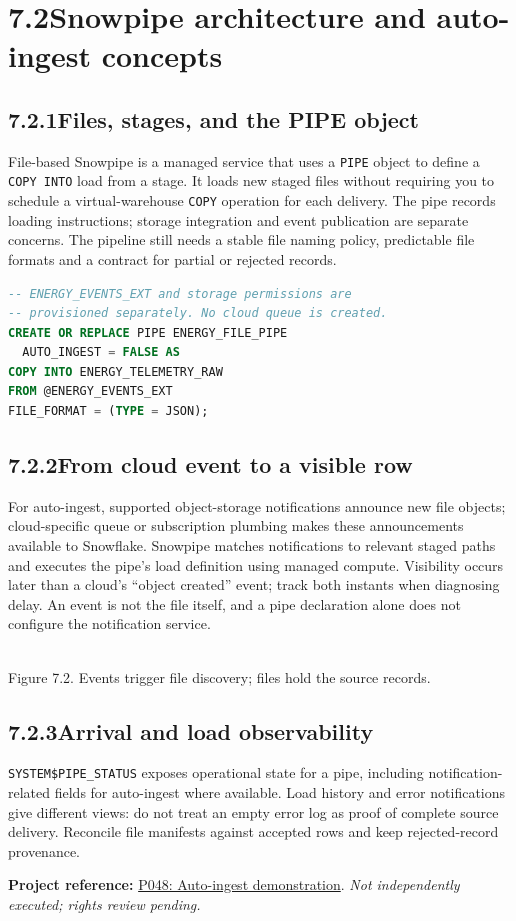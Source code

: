 \documentclass[11pt,twoside]{article}
\newcommand{\topic}[2]{\subsection*{#1\quad #2}}
\newcommand{\repo}[2]{\par\begingroup\fontsize{8.0}{9.6}\selectfont\sffamily\color{inkgray}\textbf{Project reference:} \href{#2}{#1}. \textit{Not independently executed; rights review pending.}\par\endgroup}
\begin{document}
\section*{7.2\quad Snowpipe architecture and auto-ingest concepts}
\topic{7.2.1}{Files, stages, and the PIPE object}
File-based Snowpipe is a managed service that uses a \texttt{PIPE} object to define a \texttt{COPY INTO} load from a stage. It loads new staged files without requiring you to schedule a virtual-warehouse \texttt{COPY} operation for each delivery. The pipe records loading instructions; storage integration and event publication are separate concerns. The pipeline still needs a stable file naming policy, predictable file formats and a contract for partial or rejected records.
\begin{lstlisting}[language=SQL,caption={File-based pipe definition; requires an approved external stage.}]
-- ENERGY_EVENTS_EXT and storage permissions are
-- provisioned separately. No cloud queue is created.
CREATE OR REPLACE PIPE ENERGY_FILE_PIPE
  AUTO_INGEST = FALSE AS
COPY INTO ENERGY_TELEMETRY_RAW
FROM @ENERGY_EVENTS_EXT
FILE_FORMAT = (TYPE = JSON);
\end{lstlisting}
\topic{7.2.2}{From cloud event to a visible row}
For auto-ingest, supported object-storage notifications announce new file objects; cloud-specific queue or subscription plumbing makes these announcements available to Snowflake. Snowpipe matches notifications to relevant staged paths and executes the pipe's load definition using managed compute. Visibility occurs later than a cloud's ``object created'' event; track both instants when diagnosing delay. An event is not the file itself, and a pipe declaration alone does not configure the notification service.
\begin{center}\\{\fontsize{8}{9}\selectfont\color{inkgray}Figure 7.2. Events trigger file discovery; files hold the source records.}\end{center}
\topic{7.2.3}{Arrival and load observability}
\texttt{SYSTEM\$PIPE\_STATUS} exposes operational state for a pipe, including notification-related fields for auto-ingest where available. Load history and error notifications give different views: do not treat an empty error log as proof of complete source delivery. Reconcile file manifests against accepted rows and keep rejected-record provenance.
\repo{P048: Auto-ingest demonstration}{https://github.com/Snowflake-Labs/sfguide-twitter-auto-ingest}
\newpage
\end{document}
